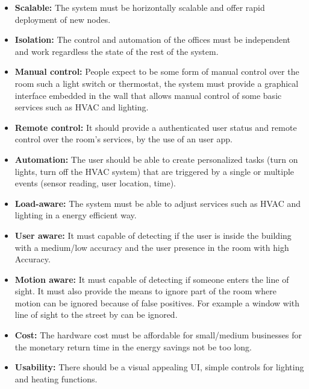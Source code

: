 \begin{itemize}
  \item \textbf{Scalable:} The system must be horizontally scalable and offer rapid deployment of new nodes.
  
  \item \textbf{Isolation:} The control and automation of the offices must be independent and work regardless the state of the rest of the system.
  
  \item \textbf{Manual control:} People expect to be some form of manual control over the room such a light switch or thermostat, the system must provide a graphical interface embedded in the wall that allows manual control of some basic services such as HVAC and lighting.
  
  \item \textbf{Remote control:} It should provide a authenticated user status and remote control over the room's services, by the use of an user app.
  
  \item \textbf{Automation:} The user should be able to create personalized tasks (turn on lights, turn off the \ac{HVAC} system) that are triggered by a single or multiple events (sensor reading, user location, time).
  
  \item \textbf{Load-aware:} The system must be able to adjust services such as HVAC and lighting in a energy efficient way.
  
  \item \textbf{User aware:} It must capable of detecting if the user is inside the building with a medium/low accuracy and the user presence in the room with high Accuracy.
  
  \item \textbf{Motion aware:} It must capable of detecting if someone enters the line of sight. It must also provide the means to ignore part of the room where motion can be ignored because of false positives. For example a window with line of sight to the street by can be ignored.
  
  
  \item \textbf{Cost:} The hardware cost must be affordable for small/medium businesses for the monetary return time in the energy savings not be too long.
  
  \item \textbf{Usability:} There should be a visual appealing \ac{UI}, simple controls for lighting and heating functions.
    

\end{itemize}





